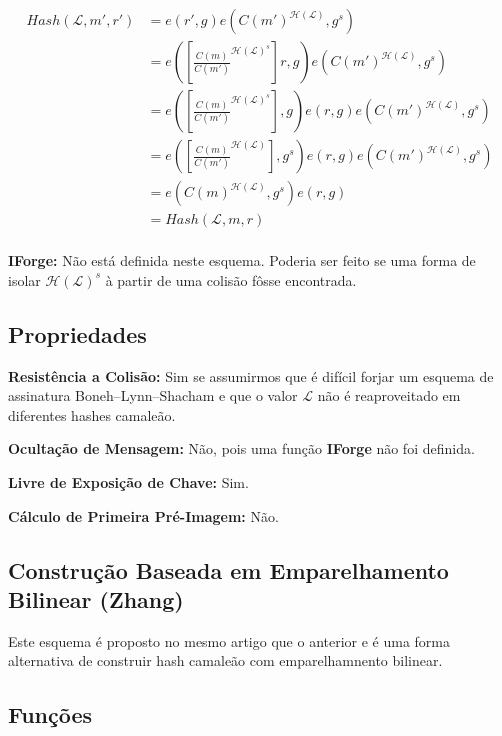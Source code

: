 \documentclass[a4paper]{article}
\begin{document}
\begin{equation}
\begin{split}
  Hash(\mathcal{L}, m', r') &= e(r', g)e(C(m')^{\mathcal{H}(\mathcal{L})}, g^s)\\
  &= e(\left[\frac{C(m)}{C(m')}^{\mathcal{H}(\mathcal{L})^s}\right]r, g)e(C(m')^{\mathcal{H}(\mathcal{L})}, g^s)\\
  &=e(\left[\frac{C(m)}{C(m')}^{\mathcal{H}(\mathcal{L})^s}\right], g)e(r, g)e(C(m')^{\mathcal{H}(\mathcal{L})}, g^s)\\
  &=e(\left[\frac{C(m)}{C(m')}^{\mathcal{H}(\mathcal{L})}\right], g^s)e(r, g)e(C(m')^{\mathcal{H}(\mathcal{L})}, g^s)\\
  &=e(C(m)^{\mathcal{H}(\mathcal{L})}, g^s)e(r, g)\\
  &= Hash(\mathcal{L}, m, r)\\
\end{split}
\end{equation}

\textbf{IForge:} Não está definida neste esquema. Poderia ser feito se
uma forma de isolar $\mathcal{H}(\mathcal{L})^s$ à partir de uma
colisão fôsse encontrada.

\subsection{Propriedades}

\textbf{Resistência a Colisão: }Sim se assumirmos que é difícil forjar
um esquema de assinatura Boneh–Lynn–Shacham e que o valor
$\mathcal{L}$ não é reaproveitado em diferentes hashes camaleão.

\textbf{Ocultação de Mensagem: }Não, pois uma função \textbf{IForge}
não foi definida.

\textbf{Livre de Exposição de Chave: } Sim.

\textbf{Cálculo de Primeira Pré-Imagem: }Não.

\subsection{Construção Baseada em Emparelhamento Bilinear (Zhang) \cite{zhang}}

Este esquema é proposto no mesmo artigo que o anterior e é uma forma
alternativa de construir hash camaleão com emparelhamnento bilinear.

\subsection{Funções}
\end{document}

